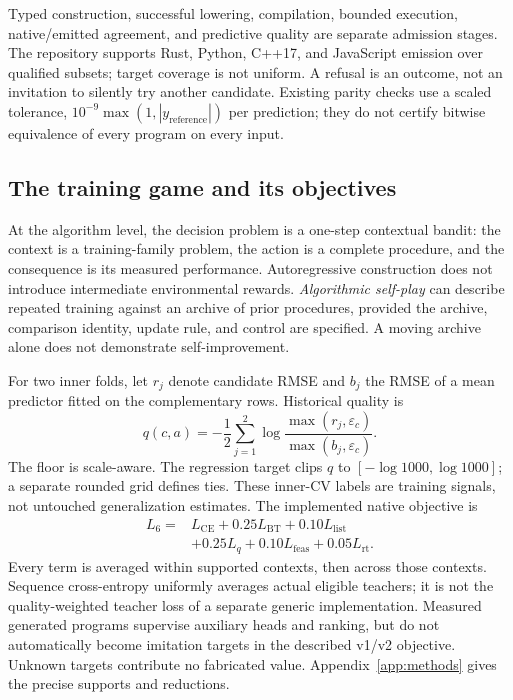 Typed construction, successful lowering, compilation, bounded execution,
native/emitted agreement, and predictive quality are separate admission stages.
The repository supports Rust, Python, C++17, and JavaScript emission over
qualified subsets; target coverage is not uniform. A refusal is an outcome, not
an invitation to silently try another candidate. Existing parity checks use a
scaled tolerance, $10^{-9}\max(1,|y_{\mathrm{reference}}|)$ per prediction;
they do not certify bitwise equivalence of every program on every input.

\subsection{The training game and its objectives}

At the algorithm level, the decision problem is a one-step contextual bandit:
the context is a training-family problem, the action is a complete procedure,
and the consequence is its measured performance. Autoregressive construction
does not introduce intermediate environmental rewards. \emph{Algorithmic
self-play} can describe repeated training against an archive of prior
procedures, provided the archive, comparison identity, update rule, and control
are specified. A moving archive alone does not demonstrate self-improvement.

For two inner folds, let $r_j$ denote candidate RMSE and $b_j$ the RMSE of a
mean predictor fitted on the complementary rows. Historical quality is
\begin{equation}
 q(c,a)=-\frac12\sum_{j=1}^{2}
 \log\frac{\max(r_j,\varepsilon_c)}{\max(b_j,\varepsilon_c)}.
 \label{eq:inner-quality}
\end{equation}
The floor is scale-aware. The regression target clips $q$ to
$[-\log 1000,\log 1000]$; a separate rounded grid defines ties.
These inner-CV labels are training signals, not untouched generalization
estimates. The implemented native objective is
\begin{align}
 L_6={}&L_{\mathrm{CE}}+0.25L_{\mathrm{BT}}+0.10L_{\mathrm{list}}\nonumber\\
       &+0.25L_q+0.10L_{\mathrm{feas}}+0.05L_{\mathrm{rt}}.
 \label{eq:l6}
\end{align}
Every term is averaged within supported contexts, then across those contexts.
Sequence cross-entropy uniformly averages actual eligible teachers; it is not
the quality-weighted teacher loss of a separate generic implementation.
Measured generated programs supervise auxiliary heads and ranking, but do not
automatically become imitation targets in the described v1/v2 objective.
Unknown targets contribute no fabricated value. Appendix~\ref{app:methods}
gives the precise supports and reductions.

